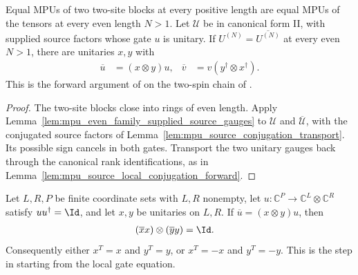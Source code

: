 \begin{lemma}
    \label{lem:mpu_source_local_conjugation_forward_even}
    \leanok
    Equal MPUs of two two-site blocks at every positive length are equal MPUs of
    the tensors at every even length $N>1$. Let $\mathcal U$ be in canonical
    form II, with supplied source factors whose gate $u$ is unitary. If
    $U^{(N)}=\overline{U^{(N)}}$ at every even $N>1$, there are unitaries $x,y$
    with
    \begin{align}
        \overline u & =(x\otimes y)u,                 &
        \overline v & =v(y^\dagger\otimes x^\dagger).
    \end{align}
    This is the forward argument of \cite[Proposition~V.1, lines~1030--1038]{Cirac2017MPU}
    on the two-spin chain of \cite{gap:mpu_standard_form_canonical_convention}.
\end{lemma}

\begin{proof}
    \leanok
    The two-site blocks close into rings of even length. Apply
    Lemma~\ref{lem:mpu_even_family_supplied_source_gauges} to $\mathcal U$ and
    $\overline{\mathcal U}$, with the conjugated source factors of
    Lemma~\ref{lem:mpu_source_conjugation_transport}. Its possible sign cancels
    in both gates. Transport the two unitary gauges back through the canonical
    rank identifications, as in Lemma~\ref{lem:mpu_source_local_conjugation_forward}.
\end{proof}

\begin{lemma}
    \label{lem:mpu_local_conjugation_sign}
    \leanok
    Let $L,R,P$ be finite coordinate sets with $L,R$ nonempty, let
    $u:\mathbb C^P\to\mathbb C^L\otimes\mathbb C^R$ satisfy
    $uu^\dagger=\Id$, and let $x,y$ be unitaries on $L,R$. If
    $\overline u=(x\otimes y)u$, then
    \begin{align}
        (\overline xx)\otimes(\overline yy) & =\Id.
    \end{align}
    Consequently either $x^T=x$ and $y^T=y$, or $x^T=-x$ and $y^T=-y$.
    This is the step in \cite[lines~1033--1038]{Cirac2017MPU} starting from
    the local gate equation.
\end{lemma}

